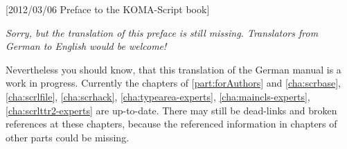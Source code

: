%
%
%
%
%
%
%
%
%

[2012/03/06 Preface to the KOMA-Script book]



\emph{Sorry, but the translation of this preface is still missing. Translators
  from German to English would be welcome!}

Nevertheless you should know, that this translation of the German
\KOMAScript{} manual is a work in progress. Currently the chapters of
\autoref{part:forAuthors} and \autoref{cha:scrbase}, \autoref{cha:scrlfile},
\autoref{cha:scrhack}, \autoref{cha:typearea-experts},
\autoref{cha:maincls-experts}, \autoref{cha:scrlttr2-experts} are
up-to-date. There may still be dead-links and broken references at these
chapters, because the referenced information in chapters of other parts could
be missing.

